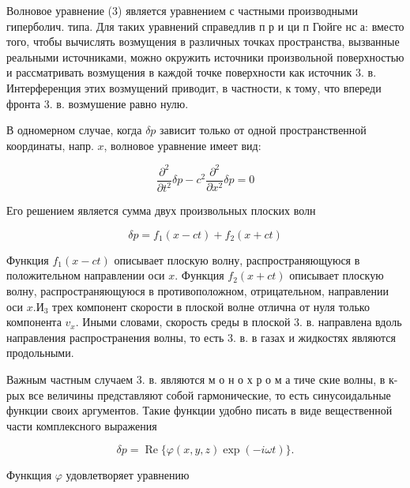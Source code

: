 \documentclass[10pt]{article}
\begin{document}
Волновое уравнение (3) является уравнением с частными производными гиперболич. типа. Для таких уравнений справедлив п р и ци п Гюйге нс а: вместо того, чтобы вычислять возмущения в различных точках пространства, вызванные реальными источниками, можно окружить источники произвольной поверхностью и рассматривать возмущения в каждой точке поверхности как источник 3. в. Интерференция этих возмущений приводит, в частности, к тому, что впереди фронта 3. в. возмушение равно нулю.



В одномерном случае, когда $\delta p$ зависит только от одной пространственной координаты, напр. $x$, волновое уравнение имеет вид:



\[

\frac{\partial^{2}}{\partial t^{2}} \delta p-c^{2} \frac{\partial^{2}}{\partial x^{2}} \delta p=0

\]



Его решением является сумма двух произвольных плоских волн



\[

\delta p=f_{1}(x-c t)+f_{2}(x+c t)

\]



Функция $f_{1}(x-c t)$ описывает плоскую волну, распространяющуюся в положительном направлении оси $x$. Функция $f_{2}(x+c t)$ описывает плоскую волну, распространяющуюся в противоположном, отрицательном, направлении оси $x . И_{3}$ трех компонент скорости в плоской волне отлична от нуля только компонента $v_{x}$. Иными словами, скорость среды в плоской 3. в. направлена вдоль направления распространения волны, то есть 3. в. в газах и жидкостях являются продольными.



Важным частным случаем 3. в. являются м о н о х р о м а тиче ские волны, в к-рых все величины представляют собой гармонические, то есть синусоидальные функции своих аргументов. Такие функции удобно писать в виде вещественной части комплексного выражения



\[

\delta p=\operatorname{Re}\{\varphi(x, y, z) \exp (-i \omega t)\} .

\]



Функщия $\varphi$ удовлетворяет уравнению
\end{document}
